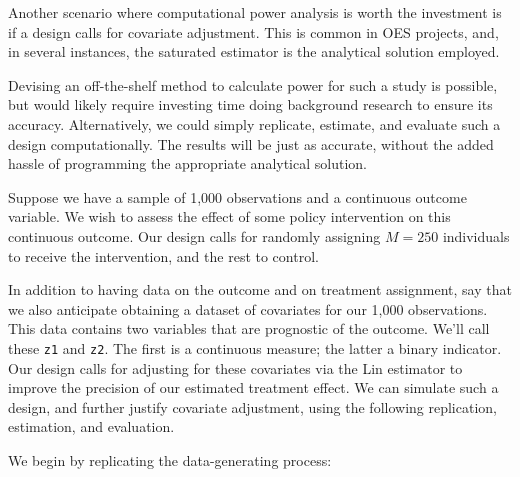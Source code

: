 \documentclass[
  12pt,
]{book}
\newenvironment{Shaded}{\begin{snugshade}}{\end{snugshade}}
\newcommand{\CommentTok}[1]{\textcolor[rgb]{0.56,0.35,0.01}{\textit{#1}}}
\newcommand{\DataTypeTok}[1]{\textcolor[rgb]{0.13,0.29,0.53}{#1}}
\newcommand{\DecValTok}[1]{\textcolor[rgb]{0.00,0.00,0.81}{#1}}
\newcommand{\FloatTok}[1]{\textcolor[rgb]{0.00,0.00,0.81}{#1}}
\newcommand{\KeywordTok}[1]{\textcolor[rgb]{0.13,0.29,0.53}{\textbf{#1}}}
\newcommand{\NormalTok}[1]{#1}
\newcommand{\OperatorTok}[1]{\textcolor[rgb]{0.81,0.36,0.00}{\textbf{#1}}}
\newcommand{\StringTok}[1]{\textcolor[rgb]{0.31,0.60,0.02}{#1}}
\theoremstyle{definition}
\theoremstyle{definition}
\theoremstyle{definition}
\theoremstyle{remark}
\begin{document}
Another scenario where computational power analysis is worth the
investment is if a design calls for covariate adjustment. This is common
in OES projects, and, in several instances, the
\citet{lin_agnostic_2013} saturated estimator is the analytical solution
employed.

Devising an off-the-shelf method to calculate power for such a study is
possible, but would likely require investing time doing background
research to ensure its accuracy. Alternatively, we could simply
replicate, estimate, and evaluate such a design computationally. The
results will be just as accurate, without the added hassle of
programming the appropriate analytical solution.

Suppose we have a sample of 1,000 observations and a continuous outcome
variable. We wish to assess the effect of some policy intervention on
this continuous outcome. Our design calls for randomly assigning
\(M = 250\) individuals to receive the intervention, and the rest to
control.

In addition to having data on the outcome and on treatment assignment,
say that we also anticipate obtaining a dataset of covariates for our
1,000 observations. This data contains two variables that are prognostic
of the outcome. We'll call these \texttt{z1} and \texttt{z2}. The first
is a continuous measure; the latter a binary indicator. Our design calls
for adjusting for these covariates via the Lin estimator to improve the
precision of our estimated treatment effect. We can simulate such a
design, and further justify covariate adjustment, using the following
replication, estimation, and evaluation.

We begin by replicating the data-generating process:

\begin{Shaded}
\end{Shaded}
\end{document}
